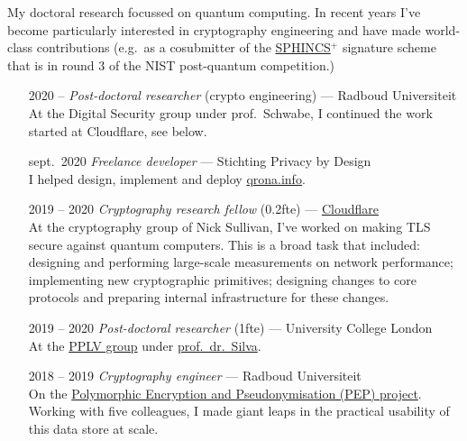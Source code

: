 \documentclass[a4page]{article}
\newcommand\partitle[1]{\vskip20pt\par\noindent{\textsf{\textbf{#1}}}}
\begin{document}
My doctoral research focussed on quantum computing.
In recent years I've become particularly interested
    in cryptography engineering and have made world-class contributions
        (e.g.~as a cosubmitter of the
	\href{https://sphincs.org/data/sphincs+-round3-specification.pdf}{SPHINCS$^+$}
    signature scheme that is in round 3 of the NIST post-quantum competition.)

\partitle{Career}
\begin{itemize}
    \item[2020 --] \emph{Post-doctoral researcher} (crypto engineering) --- Radboud Universiteit\\
        At the Digital Security group under prof.~Schwabe,
            I continued the work started at Cloudflare, see below.
    \item[sept.~2020] \emph{Freelance developer} --- Stichting Privacy by Design\\
        I helped design, implement and deploy \href{https://qrona.info}{qrona.info}.
    \item[2019 -- 2020] \emph{Cryptography research fellow} (0.2fte) --- 
        \href{https://cloudflare.com}{Cloudflare} \\
        At the cryptography group of Nick Sullivan, I've
            worked on making TLS secure against quantum computers.
        This is a broad task that included:
                designing and performing large-scale measurements on network
                    performance;
                implementing new cryptographic primitives;
                designing changes to core protocols and
                    preparing internal infrastructure for these changes.
    \item[2019 -- 2020] \emph{Post-doctoral researcher} (1fte) --- University
        College London\\
        At the \href{http://pplv.cs.ucl.ac.uk/welcome/}{PPLV group}
            under \href{https://alexandrasilva.org/#/main.html}{prof.~dr.~Silva}.
    \item[2018 -- 2019] \emph{Cryptography engineer} --- Radboud Universiteit\\
        On the \href{https://pep.cs.ru.nl}{Polymorphic Encryption and Pseudonymisation (PEP) project}.
        Working with five colleagues, I made giant leaps in the practical usability
        of this data store at scale.


\end{itemize}
\end{document}
